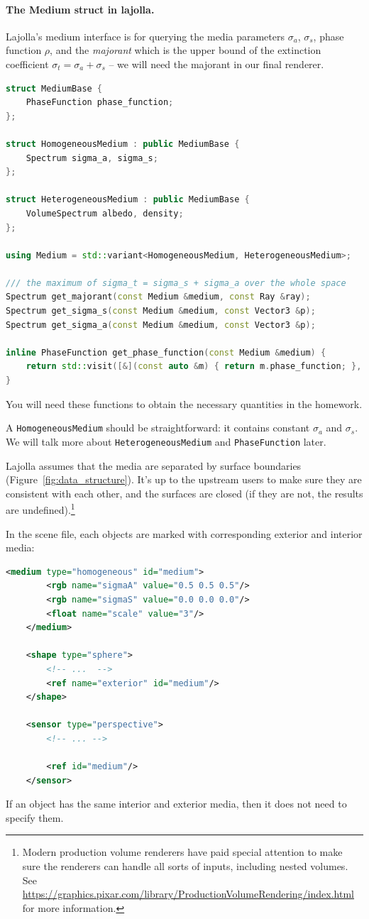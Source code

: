 \paragraph{The Medium struct in lajolla.} Lajolla's medium interface is for querying the media parameters $\sigma_a$, $\sigma_s$, phase function $\rho$, and the \emph{majorant} which is the upper bound of the extinction coefficient $\sigma_t = \sigma_a + \sigma_s$ -- we will need the majorant in our final renderer. 
\begin{lstlisting}[language=c++]
struct MediumBase {
    PhaseFunction phase_function;
};

struct HomogeneousMedium : public MediumBase {
    Spectrum sigma_a, sigma_s;
};

struct HeterogeneousMedium : public MediumBase {
    VolumeSpectrum albedo, density;
};

using Medium = std::variant<HomogeneousMedium, HeterogeneousMedium>;

/// the maximum of sigma_t = sigma_s + sigma_a over the whole space
Spectrum get_majorant(const Medium &medium, const Ray &ray);
Spectrum get_sigma_s(const Medium &medium, const Vector3 &p);
Spectrum get_sigma_a(const Medium &medium, const Vector3 &p);

inline PhaseFunction get_phase_function(const Medium &medium) {
    return std::visit([&](const auto &m) { return m.phase_function; }, medium);
}
\end{lstlisting}
You will need these functions to obtain the necessary quantities in the homework.

A \lstinline{HomogeneousMedium} should be straightforward: it contains constant $\sigma_a$ and $\sigma_s$.
We will talk more about \lstinline{HeterogeneousMedium} and \lstinline{PhaseFunction} later.

Lajolla assumes that the media are separated by surface boundaries (Figure~\ref{fig:data_structure}). It's up to the upstream users to make sure they are consistent with each other, and the surfaces are closed (if they are not, the results are undefined).\footnote{Modern production volume renderers have paid special attention to make sure the renderers can handle all sorts of inputs, including nested volumes. See \href{here}{https://graphics.pixar.com/library/ProductionVolumeRendering/index.html} for more information.}

In the scene file, each objects are marked with corresponding exterior and interior media:
\begin{lstlisting}[language=xml]
    <medium type="homogeneous" id="medium">
        <rgb name="sigmaA" value="0.5 0.5 0.5"/>
        <rgb name="sigmaS" value="0.0 0.0 0.0"/>
        <float name="scale" value="3"/>
    </medium>

    <shape type="sphere">
        <!-- ...  -->
        <ref name="exterior" id="medium"/>
    </shape>

    <sensor type="perspective">
        <!-- ... -->

        <ref id="medium"/>
    </sensor>
\end{lstlisting}
If an object has the same interior and exterior media, then it does not need to specify them. 

